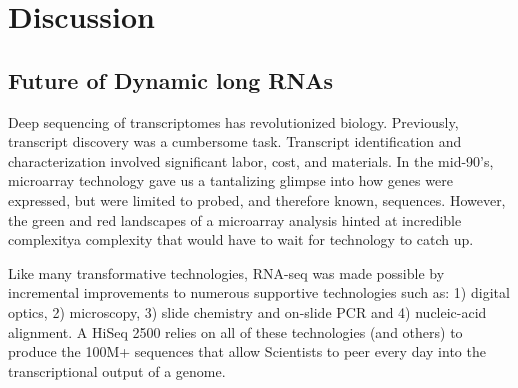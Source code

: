 \chapter{Discussion} %

\label{Chapter 5} %


\section{Future of Dynamic long RNAs}







Deep sequencing of transcriptomes has revolutionized biology. Previously, transcript discovery was a cumbersome task. Transcript identification and characterization involved significant labor, cost, and materials. In the mid-90's, microarray technology \citep{Schena1995a} gave us a tantalizing glimpse into how genes were expressed, but were limited to probed, and therefore known, sequences. However, the green and red landscapes of a microarray analysis hinted at incredible complexity\textemdash a complexity that would have to wait for technology to catch up.

Like many transformative technologies, RNA-seq was made possible by incremental improvements to numerous supportive technologies such as: 1) digital optics, 2) microscopy, 3) slide chemistry and on-slide PCR and 4) nucleic-acid alignment. A HiSeq 2500 relies on all of these technologies (and others) to produce the 100M+ sequences that allow Scientists to peer every day into the transcriptional output of a genome.

